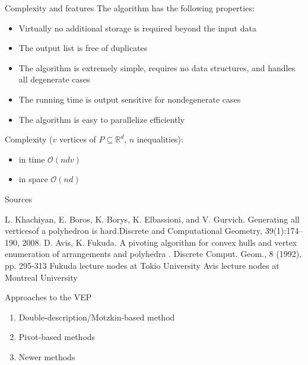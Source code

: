 \documentclass[10pt]{beamer}
\begin{document}
\begin{frame}{Complexity and features}
	The algorithm has the following properties:
	\begin{itemize}
		\item Virtually no additional storage is required beyond the input data
		\item The output list is free of duplicates
		\item The algorithm is extremely simple, requires no data structures, and handles all degenerate cases
		\item The running time is output sensitive for nondegenerate cases
		\item The algorithm is easy to parallelize efficiently
	\end{itemize}
 	\pause
	\vspace{0.5cm}
	Complexity ($v$ vertices of  $P\subseteq\mathbb{R}^d$, $n$ inequalities):
	\begin{itemize}
		\item in time $\mathcal{O}(ndv)$
		\item in space $\mathcal{O}(nd)$
	\end{itemize}
	
\end{frame}


\appendix
\begin{frame}{Sources}
	\footnotesize
	\begin{thebibliography}{9}
			L. Khachiyan, E. Boros, K. Borys, K. Elbassioni, and V. Gurvich. Generating all verticesof a polyhedron is hard.Discrete and Computational Geometry, 39(1):174–190, 2008.
			D. Avis, K. Fukuda.
			A pivoting algorithm for convex hulls and vertex enumeration of arrangements and polyhedra
.
			Discrete Comput. Geom., 8 (1992), pp. 295-313
			Fukuda lecture nodes at Tokio University
			Avis lecture nodes at Montreal University
		
	\end{thebibliography}
\end{frame}


\begin{frame}{Approaches to the VEP}
	\begin{enumerate}
		\item Double-description/Motzkin-based method
		\item Pivot-based methods
		\item Newer methods
	\end{enumerate}
\end{frame}
\end{document}
